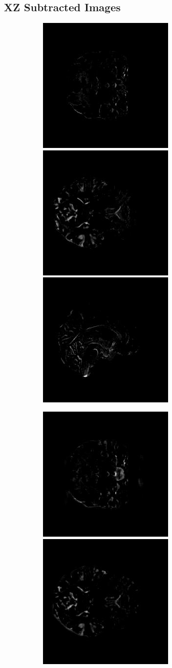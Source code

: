 \documentclass[12pt, fleqn, titlepage]{article}
\newcommand\skipperer{0.45pt}
\newcommand\ripperer{1.25pt}
\newcommand{\1}[1]{\mathds{1}\left[#1\right]}
\begin{document}
\subsection{XZ Subtracted Images}\label{xz_subtracted_images}
\begin{figure}[H]
	\centering
	\begin{subfigure}[b]{0.8\textwidth}
		\centering
		\includegraphics[width=0.22\linewidth]{imgs/subtracted_images/xz/002_S_0559_xy_gts_comparison}
		\hskip\skipperer
		\includegraphics[width=0.22\linewidth]{imgs/subtracted_images/xz/002_S_0559_xz_gts_comparison}
		\hskip\skipperer
		\includegraphics[width=0.22\linewidth]{imgs/subtracted_images/xz/002_S_0559_yz_gts_comparison}
	\end{subfigure}
	\vskip\ripperer
	\begin{subfigure}[b]{0.8\textwidth}
		\centering
		\includegraphics[width=0.22\linewidth]{imgs/subtracted_images/xz/002_S_0559_xy_1.5_1.5gen_comparison}
		\hskip\skipperer
		\includegraphics[width=0.22\linewidth]{imgs/subtracted_images/xz/002_S_0559_xz_1.5_1.5gen_comparison}

\end{subfigure}
\end{figure}
\end{document}
